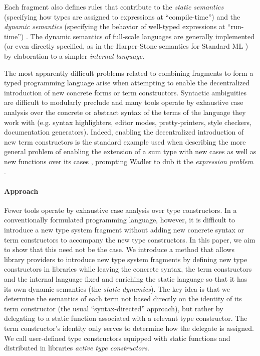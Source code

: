 \documentclass[9pt,preprint]{sigplanconf}
\begin{document}
  Each fragment also defines rules that contribute to the \emph{static semantics} (specifying how types are assigned to expressions at ``compile-time'') and the \emph{dynamic semantics} (specifying the behavior of well-typed expressions at ``run-time'') \cite{pfpl}. The dynamic semantics of full-scale languages are generally implemented (or even directly specified, as in the Harper-Stone semantics for Standard ML \cite{Harper00atype-theoretic}) by elaboration to a simpler \emph{internal language}.%

The most apparently difficult problems related to combining fragments to form a typed programming language arise when attempting to enable the decentralized introduction of new concrete forms or term constructors. Syntactic ambiguities are difficult to modularly preclude and many tools operate by exhaustive case analysis over the concrete or abstract syntax of the terms of the language they work with (e.g. syntax highlighters, editor modes, pretty-printers, style checkers, documentation generators). Indeed, enabling the decentralized introduction of new term constructors is the standard example used when describing the more general problem of enabling the extension of a sum type with new cases as well as new  functions over its cases  \cite{Reynolds75}, prompting Wadler to dub it the \emph{expression problem} \cite{wadler1998expression}. 

\paragraph{Approach} Fewer tools operate by exhaustive case analysis over type constructors. In a conventionally formulated programming language, however, it is difficult to introduce a new type system fragment without adding new concrete syntax or term constructors to accompany the new type constructors. In this paper, we aim to show that this need not be the case. We introduce a method that allows library providers to introduce new type system fragments by defining new type constructors in libraries while leaving the concrete syntax, the term constructors and the internal language fixed and enriching the static language so that it has its own dynamic semantics (the \emph{static dynamics}). The key idea is that we determine the semantics of each term not based directly on the identity of its term constructor (the usual ``syntax-directed'' approach), but rather by delegating to a static function associated with a relevant type constructor. The term constructor's identity only serves to determine how the delegate is assigned. We call user-defined type constructors equipped with static functions and distributed in libraries \emph{active type constructors}.
\end{document}
